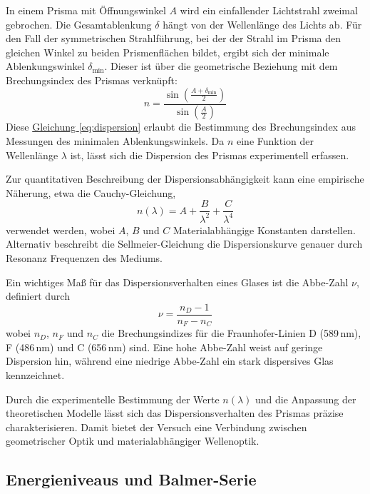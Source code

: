 In einem Prisma mit Öffnungswinkel \( A \) wird ein einfallender Lichtstrahl zweimal gebrochen. Die Gesamtablenkung \( \delta \) hängt von der Wellenlänge des Lichts ab. Für den Fall der symmetrischen Strahlführung, bei der der Strahl im Prisma den gleichen Winkel zu beiden Prismenflächen bildet, ergibt sich der minimale Ablenkungswinkel \( \delta_{\text{min}} \). Dieser ist über die geometrische Beziehung mit dem Brechungsindex des Prismas verknüpft:
\begin{equation}
n = \frac{\sin\left(\frac{A + \delta_{\text{min}}}{2}\right)}{\sin\left(\frac{A}{2}\right)}
\label{eq:dispersion}
\end{equation}
Diese \hyperref[eq:dispersion]{Gleichung \ref*{eq:dispersion}} erlaubt die Bestimmung des Brechungsindex aus Messungen des minimalen Ablenkungswinkels. Da \( n \) eine Funktion der Wellenlänge \(\lambda\) ist, lässt sich die Dispersion des Prismas experimentell erfassen.

Zur quantitativen Beschreibung der Dispersionsabhängigkeit kann eine empirische Näherung, etwa die Cauchy-Gleichung,
\begin{equation}
n(\lambda) = A + \frac{B}{\lambda^2} + \frac{C}{\lambda^4}
\label{eq:cauchy}
\end{equation}
verwendet werden, wobei \(A\), \(B\) und \(C\) Materialabhängige Konstanten darstellen. Alternativ beschreibt die Sellmeier-Gleichung die Dispersionskurve genauer durch Resonanz Frequenzen des Mediums. 

Ein wichtiges Maß für das Dispersionsverhalten eines Glases ist die Abbe-Zahl \( \nu \), definiert durch
\begin{equation}
\nu = \frac{n_D - 1}{n_F - n_C}
\label{eq:abbe}
\end{equation}
wobei \(n_D\), \(n_F\) und \(n_C\) die Brechungsindizes für die Fraunhofer-Linien D (589\,nm), F (486\,nm) und C (656\,nm) sind. Eine hohe Abbe-Zahl weist auf geringe Dispersion hin, während eine niedrige Abbe-Zahl ein stark dispersives Glas kennzeichnet. 

Durch die experimentelle Bestimmung der Werte \( n(\lambda) \) und die Anpassung der theoretischen Modelle lässt sich das Dispersionsverhalten des Prismas präzise charakterisieren. Damit bietet der Versuch eine Verbindung zwischen geometrischer Optik und materialabhängiger Wellenoptik.

\subsection{Energieniveaus und Balmer-Serie}

